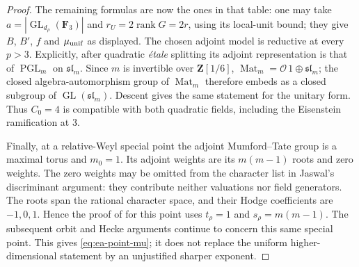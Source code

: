 \documentclass[11pt]{article}
\theoremstyle{definition}
\theoremstyle{remark}
\begin{document}
\begin{proof}
The remaining formulas are now the ones in that table: one may take
$a=|\operatorname{GL}_{d_\rho}(\mathbf F_3)|$ and
$r_U=2\operatorname{rank}G=2r$, using its local-unit bound; they give
$B$, $B'$, $f$ and $\mu_{\rm unif}$ as displayed.
The chosen adjoint model is reductive at every $p>3$.  Explicitly,
after quadratic \emph{\'etale} splitting its adjoint representation is
that of $\operatorname{PGL}_m$ on $\mathfrak{sl}_m$.
Since $m$ is invertible over $\mathbf Z[1/6]$,
$\operatorname{Mat}_m=\mathcal O\,1\oplus\mathfrak{sl}_m$;
the closed algebra-automorphism group of $\operatorname{Mat}_m$
therefore embeds as a closed subgroup of
$\operatorname{GL}(\mathfrak{sl}_m)$.  Descent gives the same statement
for the unitary form.  Thus $C_0=4$ is compatible with both quadratic
fields, including the Eisenstein ramification at $3$.

Finally, at a relative-Weyl special point the adjoint Mumford--Tate
group is a maximal torus and $m_0=1$.  Its adjoint weights are its
$m(m-1)$ roots and zero weights.  The zero weights may be omitted from
the character list in Jaswal's discriminant argument: they contribute
neither valuations nor field generators.  The roots span the rational
character space, and their Hodge coefficients are $-1,0,1$.
Hence the proof of \cite[Proposition~3.3]{Jaswal} for this point uses
$t_\rho=1$ and $s_\rho=m(m-1)$.  The subsequent orbit and Hecke arguments
continue to concern this same special point.  This gives
\eqref{eq:ea-point-mu}; it does not replace the uniform higher-dimensional
statement by an unjustified sharper exponent.
\end{proof}
\end{document}
